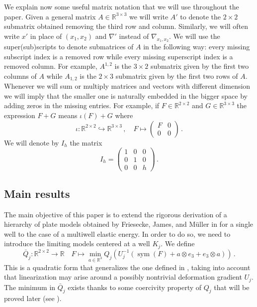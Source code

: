 \documentclass{article}
\theoremstyle{plain}
\theoremstyle{plain}
\theoremstyle{plain}
\theoremstyle{plain}
\theoremstyle{plain}
\theoremstyle{definition}
\theoremstyle{definition}
\renewcommand{\r}{\mathbb{R}}
\DeclareMathOperator{\sym}{sym}
\begin{document}
We explain now some useful matrix notation that we will use throughout the paper. Given a general matrix $A \in \r^{3 \times 3}$ we will write $A'$ to denote the $2 \times 2$ submatrix obtained removing the third row and column. Similarly, we will often write $x'$ in place of $(x_1, x_2)$ and $\nabla'$ instead of $\nabla_{x_1, x_2}$. We will use the super(sub)scripts to denote submatrices of $A$ in the following way: every missing subscript index is a removed row while every missing superscript index is a removed column. For example, $A^{1,2}$ is the $3 \times 2$ submatrix given by the first two columns of $A$ while $A_{1,2}$ is the $2 \times 3$ submatrix given by the first two rows of $A$. Whenever we will sum or multiply matrices and vectors with different dimension we will imply that the smaller one is naturally embedded in the bigger space by adding zeros in the missing entries. For example, if $F \in \r^{2 \times 2}$ and $G \in \r^{3 \times 3}$ the expression $F + G$ means $\iota(F) + G$ where
\[
    \iota: \r^{2 \times 2} \hookrightarrow \r^{3 \times 3} \,, \quad  F \mapsto \begin{pmatrix}
        F & 0 \\
        0 & 0
    \end{pmatrix} \,.
\]
We will denote by $I_h$ the matrix
\begin{equation}\label{eq:definition_Ih}
	I_h = \begin{pmatrix}
	1 & 0 & 0 \\
	0 & 1 & 0 \\
	0 & 0 & h
\end{pmatrix} \,.
\end{equation}

\subsection{Main results}

The main objective of this paper is to extend the rigorous derivation of a hierarchy of plate models obtained by Friesecke, James, and M\"uller in \cite{FRIESECKE2002, FRIESECKE2006} for a single well to the case of a multiwell elastic energy. In order to do so, we need to introduce the limiting models centered at a well $K_j$. We define
\begin{equation}\label{eq:definition_Q}
    \bar Q_j \colon \r^{2 \times 2} \to \r \quad F \mapsto \min_{a \in \r^3} Q_j(U_j^{-1}(\sym(F) + a \otimes e_3 + e_3 \otimes a)) \,.
\end{equation}
This is a quadratic form that generalizes the one defined in \cite[Equation (8)]{FRIESECKE2006}, taking into account that linearization may arise around a possibly nontrivial deformation gradient $U_j$. The minimum in $\bar Q_j$ exists thanks to some coercivity property of $Q_j$ that will be proved later (see ).
\end{document}
